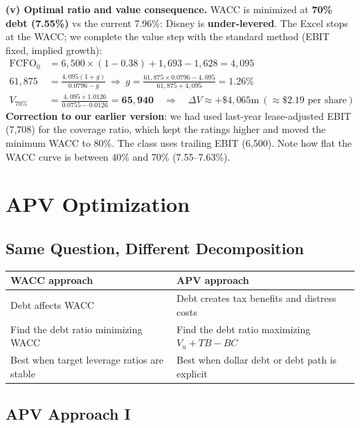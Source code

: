 \begin{exbox}
\textbf{(v) Optimal ratio and value consequence.} WACC is minimized at \textbf{70\% debt (7.55\%)} vs the current 7.96\%: Disney is \textbf{under-levered}. The Excel stops at the WACC; we complete the value step with the standard method (EBIT fixed, implied growth):
\begin{align*}
\text{FCFO}_0 &= 6{,}500\times(1-0.38)+1{,}693-1{,}628 = 4{,}095\\
61{,}875 &= \frac{4{,}095(1+g)}{0.0796-g}\ \Rightarrow\ g=\frac{61{,}875\times0.0796-4{,}095}{61{,}875+4{,}095}=1.26\%\\
V_{70\%} &= \frac{4{,}095\times1.0126}{0.0755-0.0126} = \mathbf{65{,}940}\quad\Rightarrow\quad \Delta V\approx+\$4{,}065\text{m}\ (\approx\$2.19\text{ per share})
\end{align*}
\footnotesize \textbf{Correction to our earlier version}: we had used last-year lease-adjusted EBIT (7,708) for the coverage ratio, which kept the ratings higher and moved the minimum WACC to 80\%. The class uses trailing EBIT (6,500). Note how flat the WACC curve is between 40\% and 70\% (7.55--7.63\%).
\end{exbox}

\section{APV Optimization}

\subsection[Same Question, Different Decomposition]{Same Question, Different Decomposition }

\begin{center}
\small
\begin{tabular}{@{}ll@{}}
\toprule
\textbf{WACC approach} & \textbf{APV approach}\\
\midrule
Debt affects WACC & Debt creates tax benefits and distress costs\\
Find the debt ratio minimizing WACC & Find the debt ratio maximizing $V_u+TB-BC$\\
Best when target leverage ratios are stable & Best when dollar debt or debt path is explicit\\
\bottomrule
\end{tabular}
\end{center}

\subsection[APV Approach I]{APV Approach I }


